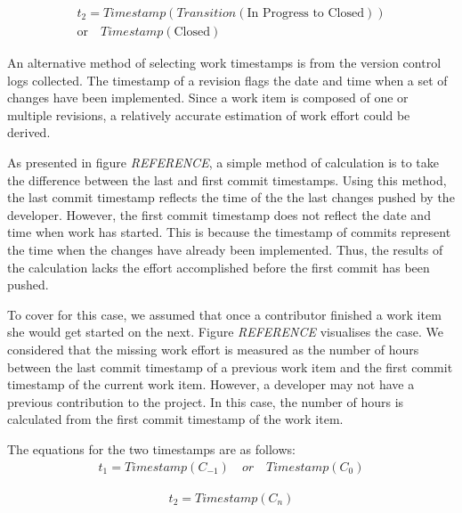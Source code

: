 \documentclass{mpaper}
\begin{document}
\begin{equation}
  \label{eq-ticket-closed}
  \begin{aligned}
    t_{2} = Timestamp(Transition(\textrm{In Progress to Closed})) \\ 
      \textrm{or} \quad Timestamp(\textrm{Closed})    
  \end{aligned}
\end{equation}

An alternative method of selecting work timestamps is from the version control
logs collected. The timestamp of a revision flags the date and time when a set
of changes have been implemented. Since a work item is composed of one or
multiple revisions, a relatively accurate estimation of work effort could be
derived.

As presented in figure \emph{REFERENCE}, a simple method of calculation is to
take the difference between the last and first commit timestamps. Using this
method, the last commit timestamp reflects the time of the the last changes
pushed by the developer. However, the first commit timestamp does not reflect
the date and time when work has started. This is because the timestamp of
commits represent the time when the changes have already been implemented. Thus,
the results of the calculation lacks the effort accomplished before the first
commit has been pushed.

To cover for this case, we assumed that once a contributor finished a work item
she would get started on the next. Figure \emph{REFERENCE} visualises the case.
We considered that the missing work effort is measured as the number of hours
between the last commit timestamp of a previous work item and the first commit
timestamp of the current work item. However, a developer may not have a previous
contribution to the project. In this case, the number of hours is calculated
from the first commit timestamp of the work item.

The equations for the two timestamps are as follows:
\begin{equation}
  \label{eq-commit-start}
  \begin{aligned}
    t_{1} = Timestamp(C_{-1}) \quad or \quad Timestamp(C_{0})
  \end{aligned}
\end{equation}

\begin{equation}
  \label{eq-commit-end}
  \begin{aligned}
    t_{2} = Timestamp(C_{n})
  \end{aligned}
\end{equation}
\end{document}
